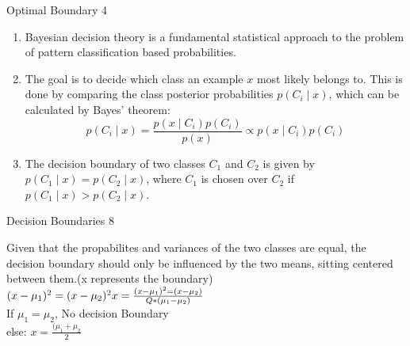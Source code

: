 \begin{questions}
	
	\begin{question}{Optimal Boundary }{4}		
	\begin{answer} 
			\begin{enumerate}
		\item 
		Bayesian decision theory is a fundamental statistical approach to the problem of pattern classification based probabilities.
		\item The goal is to decide which class an example $x$ most likely belongs to.
		This is done by comparing the class posterior probabilities $p(C_i\mid x)$, which can be calculated by Bayes' theorem:
		\[
		p(C_i \mid x)=\frac{p(x\mid C_i)p(C_i)}{p(x)} \propto p(x\mid C_i)p(C_i)
		\]
		\item The decision boundary of two classes $C_1$ and $C_2$ is given by $p(C_1\mid x)=p(C_2\mid x)$, where  $C_1$ is chosen over $C_2$ if $p(C_1\mid x)>p(C_2\mid x)$.
		\end{enumerate}
		
	\end{answer}
		
	\end{question}
	
	\begin{question}{Decision Boundaries  }{8}		
	\begin{answer} 
		Given that the propabilites and variances of the two classes are equal, the decision boundary should only be influenced by the two means, sitting centered between them.(x represents the boundary)
		$ (x-\mu_1)^2 = (x-\mu_2)^2 \\
		x = \frac{ (x-\mu_1)^2 = (x-\mu_2) }{Q * (\mu_1-\mu_2)}$ \\
		If $ \mu_1 = \mu_2 $, No decision Boundary \\
		else: $ x=\frac{(\mu_1+\mu_2}{2} $
		
	\end{answer}
		
	\end{question}
	

\end{questions}
